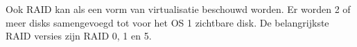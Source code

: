Ook RAID kan als een vorm van virtualisatie beschouwd worden. Er worden 2 of meer disks samengevoegd tot voor het OS 1 zichtbare disk. De belangrijkste RAID versies zijn RAID 0, 1 en 5.

